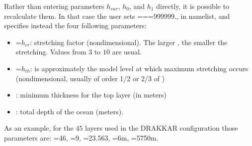 \documentclass[NEMO_book]{subfiles}
\begin{document}
Rather than entering parameters $h_{sur}$, $h_{0}$, and $h_{1}$ directly, it is 
possible to recalculate them. In that case the user sets 
===999999., in  namelist, 
and specifies instead the four following parameters:
\begin{itemize}
\item 	{}=$h_{cr} $: stretching factor (nondimensional). The larger 
, the smaller the stretching. Values from $3$ to $10$ are usual.
\item 	{}=$h_{th} $: is approximately the model level at which maximum 
stretching occurs (nondimensional, usually of order 1/2 or 2/3 of )
\item 	{}: minimum thickness for the top layer (in meters)
\item 	{}: total depth of the ocean (meters).
\end{itemize}
As an example, for the $45$ layers used in the DRAKKAR configuration those 
parameters are: =46, =9, =23.563, =6m, 
=5750m.
\end{document}
